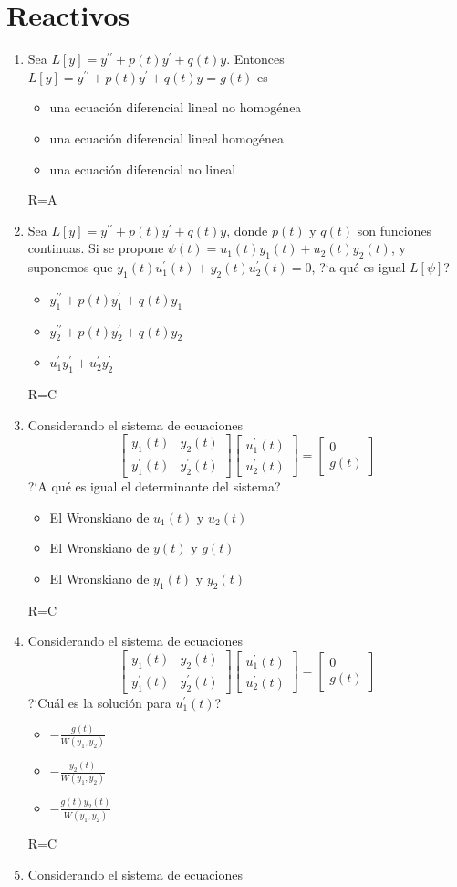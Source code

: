 \documentclass[12pt]{article}
\def\TresOp#1#2#3{
\begin{itemize}
\item[A)] #1
\item[B)] #2
\item[C)] #3
\end{itemize}
}
\def\SOH#1{%
#1^{\prime\prime}+p(t)#1^{\prime}+q(t)#1
}
\def\LasUs{
u_{1}(t)\mbox{\ y\ }u_{2}(t) 
}
\def\LasYs{
y_{1}(t)\mbox{\ y\ }y_{2}(t)
}
\begin{document}
\section{Reactivos}
\begin{enumerate}
\item Sea $L[y]=\SOH{y}$. Entonces $L[y]=\SOH{y}=g(t)$ es
\TresOp{una ecuación diferencial lineal no homogénea}
{una ecuación diferencial lineal homogénea}
{una ecuación diferencial no lineal}
{\tiny R=A}
\item Sea $L[y]=\SOH{y}$, donde $p(t)$ y $q(t)$ son funciones continuas. Si se propone 
$\psi(t)=u_{1}(t)y_{1}(t)+u_{2}(t)y_{2}(t)$, y suponemos que $y_{1}(t)u_{1}^{\prime}(t)+y_{2}(t)u_{2}^{\prime}(t)=0$, ?`a qué es igual $L[\psi]$?
\TresOp{$\SOH{y_{1}}$}
{$\SOH{y_{2}}$}
{$u_{1}^{\prime}y_{1}^{\prime}+u_{2}^{\prime}y_{2}^{\prime}$}
{\tiny R=C}
\item Considerando el sistema de ecuaciones
$$
\left[
\begin{array}{cc}
y_{1}(t) & y_{2}(t)\\
y_{1}^{\prime}(t) & y_{2}^{\prime}(t)
\end{array}\right]\left[\begin{array}{c}
u_{1}^{\prime}(t)\\
u_{2}^{\prime}(t)
\end{array}\right]=\left[\begin{array}{c}
0\\
g(t)
\end{array}\right]
$$
?`A qué es igual el determinante del sistema?
\TresOp{El Wronskiano de $\LasUs$}
{El Wronskiano de $y(t)$ y $g(t)$}
{El Wronskiano de $\LasYs$}
{\tiny R=C}
\item Considerando el sistema de ecuaciones
$$
\left[
\begin{array}{cc}
y_{1}(t) & y_{2}(t)\\
y_{1}^{\prime}(t) & y_{2}^{\prime}(t)
\end{array}\right]\left[\begin{array}{c}
u_{1}^{\prime}(t)\\
u_{2}^{\prime}(t)
\end{array}\right]=\left[\begin{array}{c}
0\\
g(t)
\end{array}\right]
$$
?`Cuál es la solución para $u_{1}^{\prime}(t)$?
\TresOp{$-\frac{g(t)}{W(y_{1},y_{2})}$}
{$-\frac{y_{2}(t)}{W(y_{1},y_{2})}$}
{$-\frac{g(t)y_{2}(t)}{W(y_{1},y_{2})}$}
{\tiny R=C}
\newpage
\item Considerando el sistema de ecuaciones

\end{enumerate}
\end{document}

